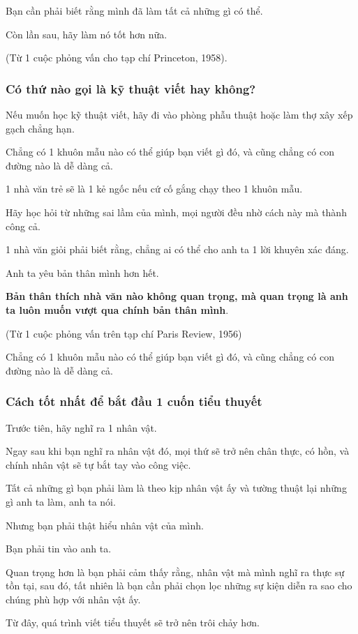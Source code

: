 \documentclass{article}
\begin{document}
Bạn cần phải biết rằng mình đã làm tất cả những gì có thể.

Còn lần sau, hãy làm nó tốt hơn nữa.

(Từ 1 cuộc phỏng vấn cho tạp chí Princeton, 1958).

\subsubsection{Có thứ nào gọi là kỹ thuật viết hay không?}
Nếu muốn học kỹ thuật viết, hãy đi vào phòng phẫu thuật hoặc làm thợ xây xếp gạch chẳng hạn.

Chẳng có 1 khuôn mẫu nào có thể giúp bạn viết gì đó, và cũng chẳng có con đường nào là dễ dàng cả.

1 nhà văn trẻ sẽ là 1 kẻ ngốc nếu cứ cố gắng chạy theo 1 khuôn mẫu.

Hãy học hỏi từ những sai lầm của mình, mọi người đều nhờ cách này mà thành công cả.

1 nhà văn giỏi phải biết rằng, chẳng ai có thể cho anh ta 1 lời khuyên xác đáng.

Anh ta yêu bản thân mình hơn hết.

\textbf{Bản thân thích nhà văn nào không quan trọng, mà quan trọng là anh ta luôn muốn vượt qua chính bản thân mình}.

(Từ 1 cuộc phỏng vấn trên tạp chí Paris Review, 1956)

\textsf{Chẳng có 1 khuôn mẫu nào có thể giúp bạn viết gì đó, và cũng chẳng có con đường nào là dễ dàng cả.}

\subsubsection{Cách tốt nhất để bắt đầu 1 cuốn tiểu thuyết}
Trước tiên, hãy nghĩ ra 1 nhân vật.

Ngay sau khi bạn nghĩ ra nhân vật đó, mọi thứ sẽ trở nên chân thực, có hồn, và chính nhân vật sẽ tự bắt tay vào công việc.

Tất cả những gì bạn phải làm là theo kịp nhân vật ấy và tường thuật lại những gì anh ta làm, anh ta nói.

Nhưng bạn phải thật hiểu nhân vật của mình.

Bạn phải tin vào anh ta.

Quan trọng hơn là bạn phải cảm thấy rằng, nhân vật mà mình nghĩ ra thực sự tồn tại, sau đó, tất nhiên là bạn cần phải chọn lọc những sự kiện diễn ra sao cho chúng phù hợp với nhân vật ấy.

Từ đây, quá trình viết tiểu thuyết sẽ trở nên trôi chảy hơn.
\end{document}
